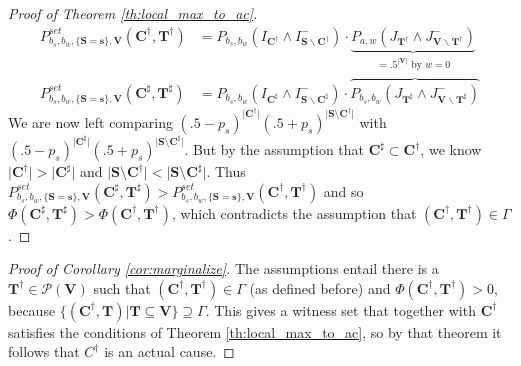 \documentclass[twoside,11pt]{article}
\begin{document}
\begin{proof}[Proof of Theorem \ref{th:local_max_to_ac}]
\begin{align}
P^{\mathit{set}}_{b_s,b_w, \{\mathbf{S}  =\mathbf{s}\}, \mathbf{V}}(\mathbf{C^\dagger},\mathbf{T^\dagger}) & =  P_{b_s, b_w}\left(I_{\mathbf{C^\dagger}} \wedge I^-_{\mathbf{S} \backslash \mathbf{C^\dagger}}\right) \cdot \underbrace{P_{a,w} \left( J_{\mathbf{T^\dagger}}  \wedge J^-_{\mathbf{V} \backslash \mathbf{T^\dagger}} \right)}_{ = .5^{\vert \mathbf{V} \vert} \text{ by $w=0$}}\\
P^{\mathit{set}}_{b_s,b_w, \{\mathbf{S}=\mathbf{s}\}, \mathbf{V}}(\mathbf{C^\sharp},\mathbf{T^\sharp}) & =  P_{b_s, b_w}\left(I_{\mathbf{C^\sharp}} \wedge I^-_{\mathbf{S} \backslash \mathbf{C^\sharp}}  \right) \cdot \overbrace{P_{b_s,b_w}  \left(  J_{\mathbf{T^\sharp}}  \wedge J^-_{\mathbf{V} \backslash \mathbf{T^\sharp}} \right)}
\end{align}
\noindent We are now left comparing $(.5-p_s)^{\vert \mathbf{C^\dagger}\vert } (.5+p_s)^{\vert \mathbf{S}\setminus{\mathbf{C^\dagger}}\vert}$ with $(.5-p_s)^{\vert \mathbf{C^\sharp}\vert } (.5+p_s)^{\vert \mathbf{S}\setminus{\mathbf{C^\sharp}}\vert}$. But by the assumption that $\mathbf{C^\sharp} \subset \mathbf{C^\dagger}$, we know $\vert \mathbf{C^\dagger}\vert > \vert \mathbf{C^\sharp}\vert$ and $\vert \mathbf{S}\setminus{\mathbf{C^\dagger}}\vert < \vert \mathbf{S}\setminus{\mathbf{C^\sharp}}\vert$. Thus $P^{\mathit{set}}_{b_s,b_w, \{\mathbf{S}=\mathbf{s}\}, \mathbf{V}}(\mathbf{C^\sharp},\mathbf{T^\sharp}) > P^{\mathit{set}}_{b_s,b_w, \{\mathbf{S}  =\mathbf{s}\}, \mathbf{V}}(\mathbf{C^\dagger},\mathbf{T^\dagger})$ and so $\Phi(\mathbf{C^\sharp}, \mathbf{T^\sharp}) > \Phi(\mathbf{C^\dagger}, \mathbf{T^\dagger})$, which  contradicts the assumption that $(\mathbf{C^\dagger}, \mathbf{T^\dagger}) \in \Gamma$.
\end{proof}




\begin{proof}[Proof of Corollary \ref{cor:marginalize}]
The assumptions entail there is a $\mathbf{T^\dagger}\in \mathcal{P}(\mathbf{V})$ such that $(\mathbf{C^\dagger}, \mathbf{T^\dagger}) \in \Gamma$ (as defined before) and $\Phi(\mathbf{C^\dagger}, \mathbf{T^\dagger})>0$, because $\{(\mathbf{C^\dagger}, \mathbf{T})\vert \mathbf{T}\subseteq \mathbf{V}\} \supseteq \Gamma$. This gives a witness set that together with $\mathbf{C^\dagger}$ satisfies the conditions of Theorem \ref{th:local_max_to_ac}, so by that theorem it follows that $C^\dagger$ is an actual cause.
\end{proof}
\end{document}
